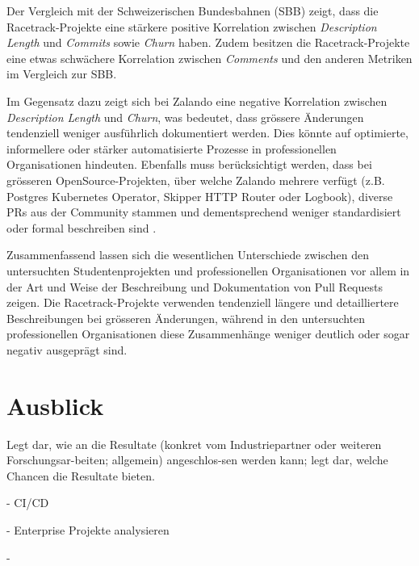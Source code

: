 Der Vergleich mit der Schweizerischen Bundesbahnen (SBB) zeigt, dass die Racetrack-Projekte eine stärkere positive Korrelation zwischen \textit{Description Length} und \textit{Commits} sowie \textit{Churn} haben. Zudem besitzen die Racetrack-Projekte eine etwas schwächere Korrelation zwischen \textit{Comments} und den anderen Metriken im Vergleich zur SBB.

Im Gegensatz dazu zeigt sich bei Zalando eine negative Korrelation zwischen \textit{Description Length} und \textit{Churn}, was bedeutet, dass grössere Änderungen tendenziell weniger ausführlich dokumentiert werden. Dies könnte auf optimierte, informellere oder stärker automatisierte Prozesse in professionellen Organisationen hindeuten. Ebenfalls muss berücksichtigt werden, dass bei grösseren OpenSource-Projekten, über welche Zalando mehrere verfügt (z.B. Postgres Kubernetes Operator, Skipper HTTP Router oder Logbook), diverse PRs aus der Community stammen und dementsprechend weniger standardisiert oder formal beschreiben sind \parencite{noauthor_zalandologbook_2025} \parencite{noauthor_zalandoskipper_2025} \parencite{noauthor_zalandopostgres-operator_2025}.

Zusammenfassend lassen sich die wesentlichen Unterschiede zwischen den untersuchten Studentenprojekten und professionellen Organisationen vor allem in der Art und Weise der Beschreibung und Dokumentation von Pull Requests zeigen. Die Racetrack-Projekte verwenden tendenziell längere und detailliertere Beschreibungen bei grösseren Änderungen, während in den untersuchten professionellen Organisationen diese Zusammenhänge weniger deutlich oder sogar negativ ausgeprägt sind.



\section{Ausblick}
Legt dar, wie an die Resultate (konkret vom Industriepartner oder weiteren Forschungsar-beiten; allgemein) angeschlos-sen werden kann; legt dar, welche Chancen die Resultate bieten.

- CI/CD

- Enterprise Projekte analysieren

- 



